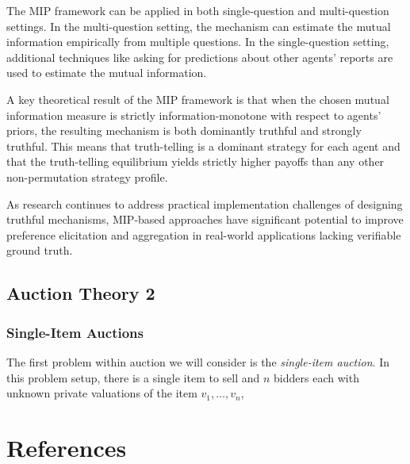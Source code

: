 \documentclass[
  letterpaper,
  numbers=noenddot,
  DIV=11,
  oneside]{scrreprt}
\theoremstyle{remark}
\begin{document}
The MIP framework can be applied in both single-question and
multi-question settings. In the multi-question setting, the mechanism
can estimate the mutual information empirically from multiple questions.
In the single-question setting, additional techniques like asking for
predictions about other agents' reports are used to estimate the mutual
information.

A key theoretical result of the MIP framework is that when the chosen
mutual information measure is strictly information-monotone with respect
to agents' priors, the resulting mechanism is both dominantly truthful
and strongly truthful. This means that truth-telling is a dominant
strategy for each agent and that the truth-telling equilibrium yields
strictly higher payoffs than any other non-permutation strategy profile.

As research continues to address practical implementation challenges of
designing truthful mechanisms, MIP-based approaches have significant
potential to improve preference elicitation and aggregation in
real-world applications lacking verifiable ground truth.

\subsection{Auction Theory 2}\label{auction-theory-2}

\subsubsection*{Single-Item Auctions}\label{single-item-auctions-1}

The first problem within auction we will consider is the
\emph{single-item auction}. In this problem setup, there is a single
item to sell and \(n\) bidders each with unknown private valuations of
the item \(v_1, \ldots, v_n\),

\section*{References}\label{bibliography-3}

\end{document}
